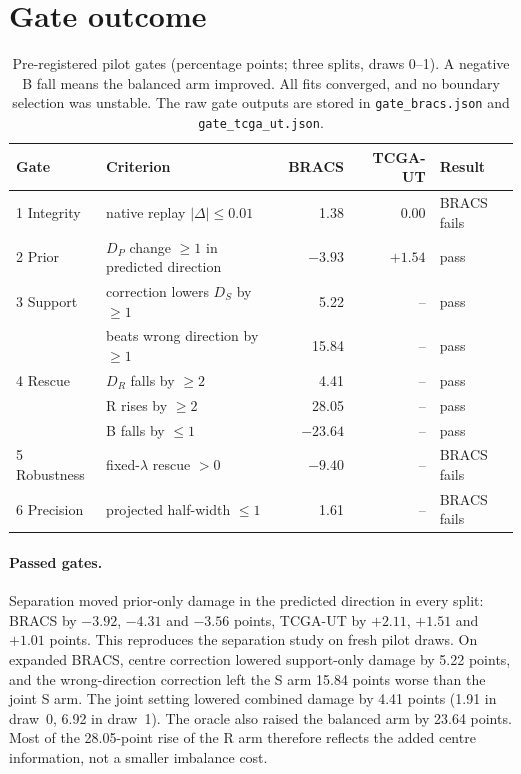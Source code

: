 \documentclass[11pt]{article}
\begin{document}
\section{Gate outcome}
\label{sec:results}
\begin{table}[ht]
  \centering
  \small
  \begin{tabular}{@{}llrrl@{}}
    \toprule
    Gate & Criterion & BRACS & TCGA-UT & Result \\
    \midrule
    1 Integrity  & native replay $|\Delta| \le 0.01$ & 1.38 & 0.00 & BRACS fails \\
    2 Prior      & $D_P$ change $\ge 1$ in predicted direction & $-3.93$ & $+1.54$ & pass \\
    3 Support    & correction lowers $D_S$ by $\ge 1$ & 5.22 & -- & pass \\
                 & beats wrong direction by $\ge 1$ & 15.84 & -- & pass \\
    4 Rescue     & $D_R$ falls by $\ge 2$ & 4.41 & -- & pass \\
                 & R rises by $\ge 2$ & 28.05 & -- & pass \\
                 & B falls by $\le 1$ & $-23.64$ & -- & pass \\
    5 Robustness & fixed-$\lambda$ rescue $> 0$ & $-9.40$ & -- & BRACS fails \\
    6 Precision  & projected half-width $\le 1$ & 1.61 & -- & BRACS fails \\
    \bottomrule
  \end{tabular}
  \caption{Pre-registered pilot gates (percentage points; three splits, draws 0--1). A negative B fall means the balanced arm improved. All fits converged, and no boundary selection was unstable. The raw gate outputs are stored in \texttt{gate\_bracs.json} and \texttt{gate\_tcga\_ut.json}.}
  \label{tab:gate}
\end{table}

\paragraph{Passed gates.} Separation moved prior-only damage in the predicted direction in every split: BRACS by $-3.92$, $-4.31$ and $-3.56$ points, TCGA-UT by $+2.11$, $+1.51$ and $+1.01$ points. This reproduces the separation study on fresh pilot draws. On expanded BRACS, centre correction lowered support-only damage by 5.22 points, and the wrong-direction correction left the S arm 15.84 points worse than the joint S arm. The joint setting lowered combined damage by 4.41 points (1.91 in draw~0, 6.92 in draw~1). The oracle also raised the balanced arm by 23.64 points. Most of the 28.05-point rise of the R arm therefore reflects the added centre information, not a smaller imbalance cost.
\end{document}

